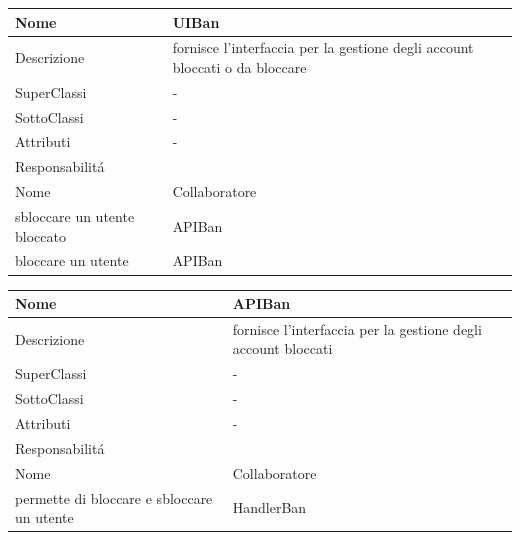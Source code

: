 
\begin{center} %
    \begin{longtable}{ |p{3cm}|p{3cm}|p{3cm}|p{3cm}| }
        \hline
        Nome & \multicolumn{3}{|p{9cm}|}{UIBan} \\\hline
        Descrizione & \multicolumn{3}{|p{9cm}|}{fornisce l'interfaccia per la gestione degli account bloccati o da bloccare} \\\hline
        SuperClassi & \multicolumn{3}{|p{9cm}|}{-} \\\hline
        SottoClassi & \multicolumn{3}{|p{9cm}|}{-} \\\hline
        Attributi & \multicolumn{3}{|p{9cm}|}{-} \\\hline
        \multicolumn{4}{|p{12cm}|}{Responsabilit\'a} \\\hline %
        \multicolumn{2}{|p{6cm}|}{Nome} & \multicolumn{2}{|p{6cm}|}{Collaboratore} \\\hline %
        \multicolumn{2}{|p{6cm}|}{sbloccare un utente bloccato} & \multicolumn{2}{|p{6cm}|}{APIBan} \\\hline        
        \multicolumn{2}{|p{6cm}|}{bloccare un utente} & \multicolumn{2}{|p{6cm}|}{APIBan} \\\hline        
    \end{longtable}
\end{center}

\begin{center} %
    \begin{longtable}{ |p{3cm}|p{3cm}|p{3cm}|p{3cm}| }
        \hline
        Nome & \multicolumn{3}{|p{9cm}|}{APIBan} \\\hline
        Descrizione & \multicolumn{3}{|p{9cm}|}{fornisce l'interfaccia per la gestione degli account bloccati} \\\hline
        SuperClassi & \multicolumn{3}{|p{9cm}|}{-} \\\hline
        SottoClassi & \multicolumn{3}{|p{9cm}|}{-} \\\hline
        Attributi & \multicolumn{3}{|p{9cm}|}{-} \\\hline
        \multicolumn{4}{|p{12cm}|}{Responsabilit\'a} \\\hline %
        \multicolumn{2}{|p{6cm}|}{Nome} & \multicolumn{2}{|p{6cm}|}{Collaboratore} \\\hline %
        \multicolumn{2}{|p{6cm}|}{permette di bloccare e sbloccare un utente} & \multicolumn{2}{|p{6cm}|}{HandlerBan} \\\hline        
    \end{longtable}
\end{center}

